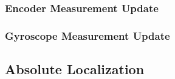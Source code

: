 \subsubsection{Encoder Measurement Update}\label{subsubsec:harlie_ekf_encoder_measurement}

\subsubsection{Gyroscope Measurement Update}\label{subsubsec:harlie_ekf_gyro_measurement}

\subsection{Absolute Localization}\label{subsec:absolute_localization}

\begin{comment}
This section details the PSO used on HARLIE and has data and figures and shit for how accurate it is

Outline:
	Why do we need localization? Why do we need PRECISE localization?

	Parts
		Relative Localization
			EKF on HARLIE
		Absolute Localization
			AMCL algorithm
			Needs tuned to prevent pops
	Results

\end{comment}
